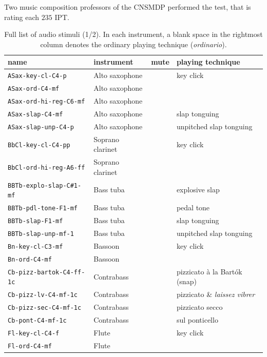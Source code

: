 \documentclass{bmcart}
\newcommand{\ipt}{IPT\xspace}
\begin{document}
\begin{backmatter}
Two music composition professors of the CNSMDP performed the test, that is rating each $235$ \ipt.

\begin{table}
\caption{Full list of audio stimuli (1/2). In each instrument, a blank space in the rightmost column denotes the ordinary playing technique (\emph{ordinario}).}
\label{tab:list1}
      \begin{tabular}{llll}
          name & instrument  & mute   &  playing technique \\ \hline \hline
        \texttt{ASax-key-cl-C4-p} & Alto saxophone & & key click \\
        \texttt{ASax-ord-C4-mf} & Alto saxophone &  &  \\
        \texttt{ASax-ord-hi-reg-C6-mf} & Alto saxophone &   & \\
        \texttt{ASax-slap-C4-mf} & Alto saxophone & & slap tonguing \\
        \texttt{ASax-slap-unp-C4-p} & Alto saxophone & & unpitched slap tonguing \\ \hline
        \texttt{BbCl-key-cl-C4-pp} & Soprano clarinet & & key click \\
        \texttt{BbCl-ord-hi-reg-A6-ff} & Soprano clarinet & & \\ \hline
        \texttt{BBTb-explo-slap-C\#1-mf} & Bass tuba &  & explosive slap \\
		\texttt{BBTb-pdl-tone-F1-mf} & Bass tuba & & pedal tone \\
		\texttt{BBTb-slap-F1-mf} & Bass tuba & & slap tonguing \\
		\texttt{BBTb-slap-unp-mf-1} & Bass tuba & & unpitched slap tonguing \\ \hline
		\texttt{Bn-key-cl-C3-mf} & Bassoon & & key click \\
		\texttt{Bn-ord-C4-mf} & Bassoon & & \\ \hline
		\texttt{Cb-pizz-bartok-C4-ff-1c} & Contrabass & & pizzicato \`a la Bart\'ok (snap) \\
		\texttt{Cb-pizz-lv-C4-mf-1c} & Contrabass & & pizzicato \& \emph{laissez vibrer} \\
        \texttt{Cb-pizz-sec-C4-mf-1c} & Contrabass & & pizzicato secco \\
        \texttt{Cb-pont-C4-mf-1c} & Contrabass & & sul ponticello \\ \hline
        \texttt{Fl-key-cl-C4-f} & Flute & & key click \\
        \texttt{Fl-ord-C4-mf} & Flute & & \\

\end{tabular}
\end{table}
\end{backmatter}
\end{document}
